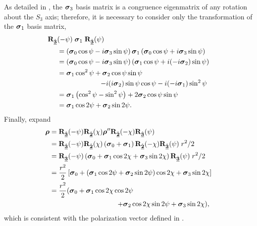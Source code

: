 As detailed in , the $\mbox{\boldmath $\sigma$}_{3}$ basis matrix is a congruence eigenmatrix of any rotation about the $S_3$ axis; therefore, it is 
%
necessary to consider only the transformation of the $\mbox{\boldmath $\sigma$}_{1}$ basis matrix,
%
\begin{equation} \begin{split}
\vRotation[3]&(-\psi)  \; \pauli{1} \;	\vRotation[3](\psi) \\
&= \left( \pauli{0}\cos\psi - \Ci\pauli{3}\sin\psi \right) \pauli{1} \left( \pauli{0}\cos\psi + \Ci\pauli{3}\sin\psi \right) \\
&= \left( \pauli{0}\cos\psi - \Ci\pauli{3}\sin\psi \right) \left( \pauli{1}\cos\psi + \Ci(-\Ci\pauli{2})\sin\psi \right) \\
&=  \pauli{1}\cos^2\psi +  \pauli{2}\cos\psi\sin\psi \\
& \omit\hfill\ensuremath{- \Ci(\Ci \pauli{2})\sin\psi\cos\psi  - \Ci(-\Ci \pauli{1})\sin^2\psi} \\
&=  \pauli{1} \left(\cos^2\psi - \sin^2\psi\right) + 2 \pauli{2} \cos\psi\sin\psi \\
&=  \pauli{1} \cos2\psi  + \pauli{2} \sin2\psi.
\end{split} \end{equation}
%
Finally, expand 
\begin{equation} \begin{split}
\cohM{\rho}
&=\vRotation[3](-\psi) \vRotation[2](\chi) \cohM{\rho}'' \vRotation[2](-\chi) \vRotation[3](\psi) \\
&=\vRotation[3](-\psi) \vRotation[2](\chi) \left(\pauli{0}+\pauli{1} \right) \vRotation[2](-\chi) \vRotation[3](\psi) \; r^2/2\\
&=\vRotation[3](-\psi)  \left(\pauli{0}+ \pauli{1} \cos2\chi  + \pauli{3} \sin2\chi \right)  \vRotation[3](\psi) \; r^2/2 \\
&=\frac{r^2}{2} \left[ \pauli{0}+ \left( \pauli{1} \cos2\psi  + \pauli{2} \sin2\psi \right) \cos2\chi  + \pauli{3} \sin2\chi \right]  \\
&=\frac{r^2}{2} ( \pauli{0}+ \pauli{1} \cos2\chi \cos2\psi \\
& \omit\hfill\ensuremath{+ \pauli{2} \cos2\chi \sin2\psi  + \pauli{3} \sin2\chi )},
\end{split} \end{equation}
which is consistent with the polarization vector defined in .

